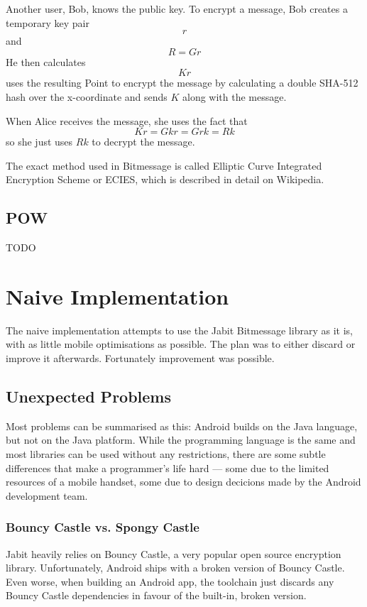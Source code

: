 \documentclass{bfh}
\begin{document}
  Another user, Bob, knows the public key. To encrypt a message, Bob creates a temporary key pair
$$r$$
and
$$R = G r$$
He then calculates
$$K r$$
uses the resulting Point to encrypt the message by calculating a double SHA-512 hash over the x-coordinate and sends $K$ along with the message.

  When Alice receives the message, she uses the fact that
$$K r = G k r = G r k = R k$$
so she just uses $R k$ to decrypt the message.

  The exact method used in Bitmessage is called Elliptic Curve Integrated Encryption Scheme or ECIES, which is described in detail on Wikipedia. \cite{wikipedia:ECC} \cite{wikipedia:ECIES}

  \subsection{\acl{POW}}
  TODO


  \section{Naive Implementation}
  
  The naive implementation attempts to use the Jabit Bitmessage library as it is, with as little mobile optimisations as possible. The plan was to either discard or improve it afterwards. Fortunately improvement was possible.

  \subsection{Unexpected Problems}
  Most problems can be summarised as this: Android builds on the Java language, but not on the Java platform. While the programming language is the same and most libraries can be used without any restrictions, there are some subtle differences that make a programmer's life hard --- some due to the limited resources of a mobile handset, some due to design decicions made by the Android development team.
  
  \subsubsection{Bouncy Castle vs. Spongy Castle}
  \label{subsec:bcvssc}
  Jabit heavily relies on Bouncy Castle, a very popular open source encryption library.\cite{bouncy} Unfortunately, Android ships with a broken version of Bouncy Castle. Even worse, when building an Android app, the toolchain just discards any Bouncy Castle dependencies in favour of the built-in, broken version.
\end{document}
